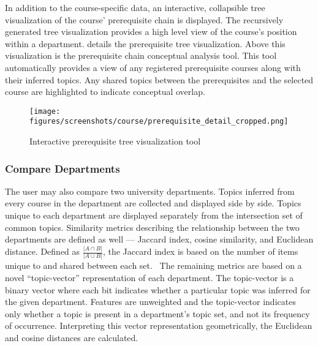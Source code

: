 
In addition to the course-specific data, an interactive, collapsible tree visualization of the course' prerequisite chain is displayed.
The recursively generated tree visualization provides a high level view of the course's position within a department.
 details the prerequisite tree visualization.
Above this visualization is the prerequisite chain conceptual analysis tool.
This tool automatically provides a view of any registered prerequisite courses along with their inferred topics.
Any shared topics between the prerequisites and the selected course are highlighted to indicate conceptual overlap.


\begin{figure*}
  \centering
  \texttt{[image: figures/screenshots/course/prerequisite\_detail\_cropped.png]}
  \caption{Interactive prerequisite tree visualization tool\label{fig:prerequisite-detail}}
\end{figure*}


\subsubsection{Compare Departments}
\label{sec:vis-compare}


The user may also compare two university departments.
Topics inferred from every course in the department are collected and displayed side by side.
Topics unique to each department are displayed separately from the intersection set of common topics.
Similarity metrics describing the relationship between the two departments are defined as well --- Jaccard index, cosine similarity, and Euclidean distance.
Defined as $\frac{\left| A \cap B\right|}{\left| A \cup B\right|}$, the Jaccard index is based on the number of items unique to and shared between each set.~\cite{jaccard1912}
The remaining metrics are based on a novel ``topic-vector'' representation of each department.
The topic-vector is a binary vector where each bit indicates whether a particular topic was inferred for the given department.
Features are unweighted and the topic-vector indicates only whether a topic is present in a department's topic set, and not its frequency of occurrence.
Interpreting this vector representation geometrically, the Euclidean and cosine distances are calculated.

